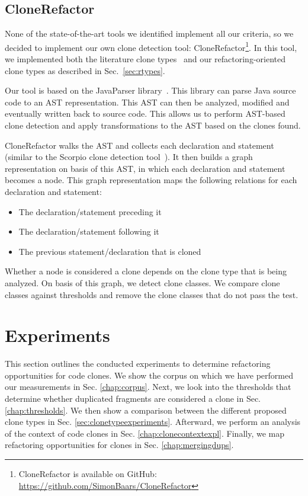 \documentclass[a4paper]{article}
\begin{document}
\subsection{CloneRefactor}
None of the state-of-the-art tools we identified implement all our criteria, so we decided to implement our own clone detection tool: CloneRefactor\footnote{CloneRefactor is available on GitHub: \url{https://github.com/SimonBaars/CloneRefactor}}. In this tool, we implemented both the literature clone types~\cite{roy2007survey} and our refactoring-oriented clone types as described in Sec.~\ref{sec:rtypes}. %


Our tool is based on the JavaParser library~\cite{tomassetti2017javaparser}. This library can parse Java source code to an AST representation. This AST can then be analyzed, modified and eventually written back to source code. This allows us to perform AST-based clone detection and apply transformations to the AST based on the clones found.

CloneRefactor walks the AST and collects each declaration and statement (similar to the Scorpio clone detection tool~\cite{higo2013revisiting}). It then builds a graph representation on basis of this AST, in which each declaration and statement becomes a node. This graph representation maps the following relations for each declaration and statement:

\begin{itemize}
  \item The declaration/statement preceding it
  \item The declaration/statement following it
  \item The previous statement/declaration that is cloned
\end{itemize}

Whether a node is considered a clone depends on the clone type that is being analyzed. On basis of this graph, we detect clone classes. We compare clone classes against thresholds and remove the clone classes that do not pass the test.

\section{Experiments}
This section outlines the conducted experiments to determine refactoring opportunities for code clones. We show the corpus on which we have performed our measurements in Sec. \ref{chap:corpus}. Next, we look into the thresholds that determine whether duplicated fragments are considered a clone in Sec. \ref{chap:thresholds}. We then show a comparison between the different proposed clone types in Sec. \ref{sec:clonetypeexperiments}. Afterward, we perform an analysis of the context of code clones in Sec. \ref{chap:clonecontextexpl}. Finally, we map refactoring opportunities for clones in Sec. \ref{chap:mergingdups}.
\end{document}
